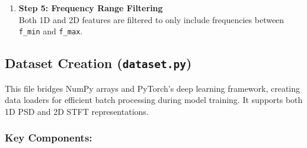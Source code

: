 \begin{enumerate}
    Normalized using Eq. \eqref{normalize}:

    \begin{equation}\label{stft_normalized}
        Z_{xx,\text{norm}} = Z_{xx,dB} - \max(Z_{xx,dB}).
    \end{equation}

    Finally, clipped using Eq. \eqref{clip} with $X_{\min} = -120$ dB:

    \begin{equation}\label{stft_clipped}
        Z_{xx,\text{clipped}} = \text{clip}(Z_{xx, \text{norm}}, -120, 0).
    \end{equation} 

    \item \textbf{Step 5: Frequency Range Filtering} \\
    Both 1D and 2D features are filtered to only include frequencies between \verb|f_min| and \verb|f_max|.
\end{enumerate}

\subsection{Dataset Creation (\texttt{dataset.py})}

This file bridges NumPy arrays and PyTorch's deep learning framework, creating data loaders for efficient 
batch processing during model training. It supports both 1D PSD and 2D STFT representations.

\subsubsection{Key Components:}

